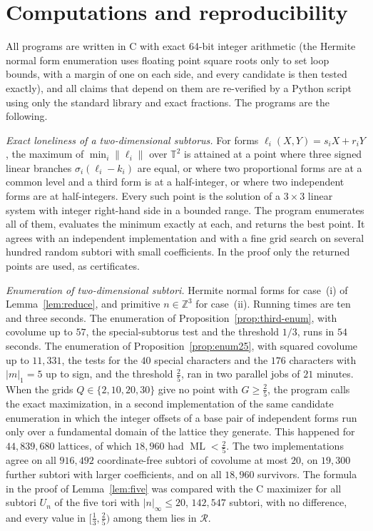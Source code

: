 \documentclass[12pt]{amsart}
\theoremstyle{definition}\newtheorem{definition}[theorem]{Definition}
\theoremstyle{remark}\newtheorem{remark}[theorem]{Remark}
\newcommand{\Z}{\mathbb Z}\newcommand{\R}{\mathbb R}\newcommand{\T}{\mathbb T}
\newcommand{\norm}[1]{\lVert #1\rVert}
\newcommand{\ML}{\operatorname{ML}}
\newcommand{\supn}[1]{\lvert #1\rvert_\infty}
\begin{document}
\section{Computations and reproducibility}\label{sec:comp}
All programs are written in C with exact 64-bit integer arithmetic (the Hermite normal form enumeration uses floating point square roots only to set loop bounds, with a margin of one on each side, and every candidate is then tested exactly), and all claims that depend on them are re-verified by a Python script using only the standard library and exact fractions. The programs are the following.

\emph{Exact loneliness of a two-dimensional subtorus.} For forms $\ell_i(X,Y)=s_iX+r_iY$, the maximum of $\min_i\norm{\ell_i}$ over $\T^2$ is attained at a point where three signed linear branches $\sigma_i(\ell_i-k_i)$ are equal, or where two proportional forms are at a common level and a third form is at a half-integer, or where two independent forms are at half-integers. Every such point is the solution of a $3\times3$ linear system with integer right-hand side in a bounded range. The program enumerates all of them, evaluates the minimum exactly at each, and returns the best point. It agrees with an independent implementation and with a fine grid search on several hundred random subtori with small coefficients. In the proof only the returned points are used, as certificates.

\emph{Enumeration of two-dimensional subtori.} Hermite normal forms for case~(i) of Lemma~\ref{lem:reduce}, and primitive $n\in\Z^3$ for case~(ii). Running times are ten and three seconds. The enumeration of Proposition~\ref{prop:third-enum}, with covolume up to $57$, the special-subtorus test and the threshold $1/3$, runs in $54$ seconds. The enumeration of Proposition~\ref{prop:enum25}, with squared covolume up to $11{,}331$, the tests for the $40$ special characters and the $176$ characters with $|m|_1=5$ up to sign, and the threshold $\frac25$, ran in two parallel jobs of $21$ minutes. When the grids $Q\in\{2,10,20,30\}$ give no point with $G\ge\frac25$, the program calls the exact maximization, in a second implementation of the same candidate enumeration in which the integer offsets of a base pair of independent forms run only over a fundamental domain of the lattice they generate. This happened for $44{,}839{,}680$ lattices, of which $18{,}960$ had $\ML<\frac25$. The two implementations agree on all $916{,}492$ coordinate-free subtori of covolume at most $20$, on $19{,}300$ further subtori with larger coefficients, and on all $18{,}960$ survivors. The formula in the proof of Lemma~\ref{lem:five} was compared with the C maximizer for all subtori $U_n$ of the five tori with $\supn n\le20$, $142{,}547$ subtori, with no difference, and every value in $[\frac13,\frac25)$ among them lies in $\mathcal R$.
\end{document}
